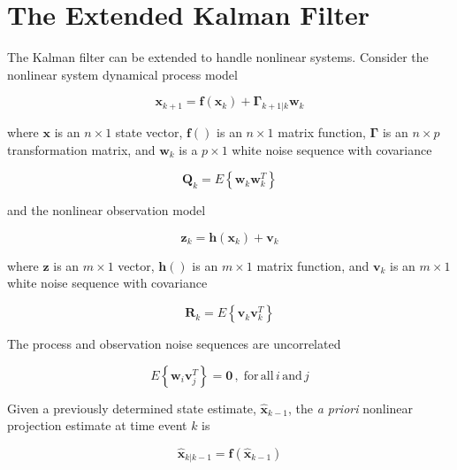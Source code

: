 \section{The Extended Kalman Filter}
\label{The Extended Kalman Filter}

The Kalman filter can be extended to handle nonlinear systems. Consider the nonlinear system dynamical process model

\begin{equation*}
    \mathbf{x}_{k+1} = \mathbf{f} \left( \mathbf{x}_k \right) + \mathbf{\Gamma}_{k+1|k} \mathbf{w}_k
\end{equation*}

where $\mathbf{x}$ is an $n \times 1$ state vector, $\mathbf{f}()$ is an $n \times 1$
matrix function, $\mathbf{\Gamma}$ is an $n \times p$ transformation matrix, and $\mathbf{w}_k$
is a $p \times 1$ white noise sequence with covariance

\begin{equation*}
    \mathbf{Q}_k = E \left\{ \mathbf{w}_k \mathbf{w}_k^T \right\}
\end{equation*}

and the nonlinear observation model

\begin{equation*}
    \mathbf{z}_k = \mathbf{h} \left( \mathbf{x}_k \right) + \mathbf{v}_k
\end{equation*}

where $\mathbf{z}$ is an $m \times 1$ vector, $\mathbf{h}()$ is an $m \times 1$ matrix
function, and $\mathbf{v}_k$ is an $m \times 1$ white noise sequence with covariance

\begin{equation*}
    \mathbf{R}_k = E \left\{ \mathbf{v}_k \mathbf{v}_k^T \right\}
\end{equation*}

The process and observation noise sequences are uncorrelated

\begin{equation*}
    E \left\{ \mathbf{w}_i \mathbf{v}_j^T \right\} = \mathbf{0} \, , \phantom{.} \mathrm{for} \, \mathrm{all} \, i \, \mathrm{and} \, j
\end{equation*}

Given a previously determined state estimate, $\hat{\mathbf{x}}_{k-1}$, the \textit{a priori}
nonlinear projection estimate at time event $k$ is

\begin{equation*}
    \hat{\mathbf{x}}_{k|k-1} = \mathbf{f} \left( \hat{\mathbf{x}}_{k-1} \right)
\end{equation*}


